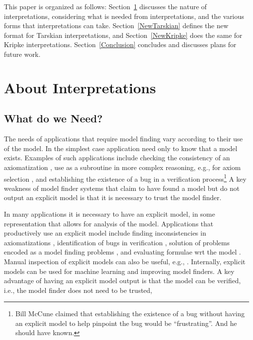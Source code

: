 \documentclass{easychair}
\begin{document}
\vspace*{1em}
This paper is organized as follows:
Section~\ref{Interpretations} discusses the nature of interpretations, considering what is
needed from interpretations, and the various forms that interpretations can take.
Section~\ref{NewTarskian} defines the new format for Tarskian interpretations, and
Section~\ref{NewKripke} does the same for Kripke interpretations.
Section~\ref{Conclusion} concludes and discusses plans for future work.

\section{About Interpretations}
\label{Interpretations}

\subsection{What do we Need?}
\label{Need}

The needs of applications that require model finding vary according to their use of the model.
In the simplest case application need only to know that a model exists.
Examples of such applications include checking the consistency of an axiomatization \cite{CI15},
use as a subroutine in more complex reasoning, e.g., for
axiom selection \cite{SP07,Pud07-ESARLT}, and establishing the existence of a bug in a
verification process\footnote{%
Bill McCune claimed that establishing the existence of a bug without having an explicit model
to help pinpoint the bug would be ``frustrating''. And he should have known.}
A key weakness of model finder systems that claim to have found a model but do not output an 
explicit model is that it is necessary to trust the model finder.

In many applications it is necessary to have an explicit model, in some representation that
allows for analysis of the model.
Applications that productively use an explicit model include finding inconsistencies in 
axiomatizations \cite{SS+17}, identification of bugs in verification \cite{CE82,QS82},
solution of problems encoded as a model finding problems \cite{Win82}, and evaluating formulae
wrt the model \cite{SS+23-LPAR}.
Manual inspection of explicit models can also be useful, e.g., \cite{EK+10}.
Internally, explicit models can be used for machine learning and improving model finders.
A key advantage of having an explicit model output is that the model can be verified, i.e., the
model finder does not need to be trusted,
\end{document}

